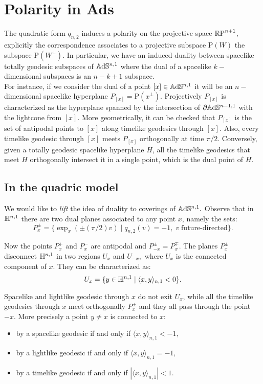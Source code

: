 \section{Polarity in Ads}\label{polarsec}
The quadratic form $q_{n,2}$ induces a polarity on the projective space $\mathbb{R}\text{P}^{n+1}$, explicitly the correspondence associates to a projective subspace $\text{P}(W)$ the subspace $\text{P}(W^\perp)$. In particular, we have an induced duality between spacelike totally geodesic subspaces of $\mathbb{A}\mathrm{d}\mathbb{S}^{n,1}$ where the dual of a spacelike $k-$dimensional subspaces is an $n-k+1$ subspace. \\
For instance, if we consider the dual of a point $[x]\in\mathbb{A}\mathrm{d}\mathbb{S}^{n,1}$ it will be an $n-$dimensional spacelike hyperplane $P_{[x]}=\text{P}(x^\perp).$ Projectively $P_{[x]}$ is characterized as the hyperplane spanned by the intersection of $\partial\mathbb{A}\mathrm{d}\mathbb{S}^{n-1,1}$ with the lightcone from $[x]$. More geometrically, it can be checked that $P_{[x]}$ is the set of antipodal points to $[x]$ along timelike geodesics through $[x].$ Also, every timelike geodesic through $[x]$ meets $P_{[x]}$ orthogonally at time $\pi/2.$ Conversely, given a totally geodesic spacelike hyperplane $H$, all the timelike geodesics that meet $H$ orthogonally intersect it in a single point, which is the dual point of $H$. 

\subsection*{In the quadric model} We would like to \textit{lift} the idea of duality to coverings of $\mathbb{A}\mathrm{d}\mathbb{S}^{n,1}.$ Observe that in $\mathbb{H}^{n,1}$ there are two dual planes associated to any point $x$, namely the sets: 
\[
    P_x^\pm=\{\exp_x(\pm(\pi/2)v)\;|\;q_{n,2}(v)=-1,\; v\;\text{future-directed}\}.
\] 

Now the points $P_x^+$ and $P_x^-$ are antipodal and $P_{-x}^\pm=P_x^\mp$. The planes $P_x^\pm$ disconnect $\mathbb{H}^{n,1}$ in two regions $U_x$ and $U_{-x},$ where $U_x$ is the connected component of $x$. They can be characterized as: 
\[
    U_x=\{y\in\mathbb{H}^{n,1}\;|\;\langle x,y\rangle_{n,1}<0\}.
\]

Spacelike and lightlike geodesic through $x$ do not exit $U_x$, while all the timelike geodesics through $x$ meet orthogonally $P_x^\pm$ and they all pass through the point $-x$. More precisely a point $y\neq x$ is connected to $x$: 
\begin{itemize}
    \item by a spacelike geodesic if and only if $\langle x,y\rangle_{n,1}<-1,$
    \item by a lightlike geodesic if and only if $\langle x,y\rangle_{n,1}=-1,$
    \item by a timelike geodesic if and only if $|\langle x,y\rangle_{n,1}|<1.$ 
\end{itemize}

